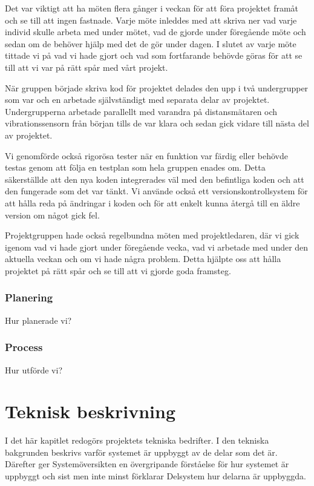 \documentclass{article}
\begin{document}
Det var viktigt att ha möten flera gånger i veckan för att föra projektet framåt och se till att ingen fastnade. Varje möte inleddes med att skriva ner vad varje individ skulle arbeta med under mötet, vad de gjorde under föregående möte och sedan om de behöver hjälp med det de gör under dagen.  I slutet av varje möte tittade vi på vad vi hade gjort och vad som fortfarande behövde göras för att se till att vi var på rätt spår med vårt projekt.

När gruppen började skriva kod för projektet delades den upp i två undergrupper som var och en arbetade självständigt med separata delar av projektet. Undergrupperna arbetade parallellt med varandra på distansmätaren och vibrationssensorn från början tills de var klara och sedan gick vidare till nästa del av projektet.

Vi genomförde också rigorösa tester när en funktion var färdig eller behövde testas genom att följa en testplan som hela gruppen enades om. Detta säkerställde att den nya koden integrerades väl med den befintliga koden och att den fungerade som det var tänkt. Vi använde också ett versionskontrollsystem för att hålla reda på ändringar i koden och för att enkelt kunna återgå till en äldre version om något gick fel.

Projektgruppen hade också regelbundna möten med projektledaren, där vi gick igenom vad vi hade gjort under föregående vecka, vad vi arbetade med under den aktuella veckan och om vi hade några problem. Detta hjälpte oss att hålla projektet på rätt spår och se till att vi gjorde goda framsteg.

\subsubsection{Planering}
Hur planerade vi?

\subsubsection{Process}
Hur utförde vi?


\section{Teknisk beskrivning}
I det här kapitlet redogörs projektets tekniska bedrifter. 
I den tekniska bakgrunden beskrivs varför systemet är uppbyggt av de delar som det är.
Därefter ger Systemöversikten en övergripande förståelse för hur systemet är uppbyggt och sist men inte minst förklarar Delsystem hur delarna är uppbyggda.
\end{document}
